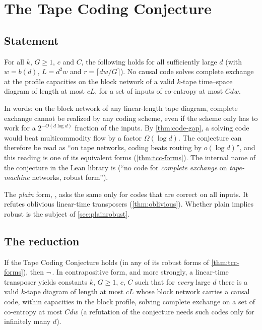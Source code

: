 \section{The Tape Coding Conjecture}\label{sec:conjecture}

\subsection{Statement}

\begin{conjecture}\label{conj:TCC}
For all $k$, $G\ge1$, $c$ and $C$, the following holds for all sufficiently large $d$ (with
$w=b(d)$, $L=d^2w$ and $r=\lceil dw/G\rceil$). No causal code solves complete exchange at the profile
capacities on the block network of a valid $k$-tape time--space diagram of length at most $cL$, for a
set of inputs of co-entropy at most $Cdw$.
\end{conjecture}

In words: on the block network of any linear-length tape diagram, complete exchange cannot be
realized by any coding scheme, even if the scheme only has to work for a $2^{-O(d\log d)}$ fraction
of the inputs. By \cref{thm:code-gap}, a solving code would beat multicommodity flow by a factor
$\Omega(\log d)$. The conjecture can therefore be read as ``on tape networks, coding beats routing by
$o(\log d)$'', and this reading is one of its equivalent forms (\cref{thm:tcc-forms}). The internal
name of the conjecture in the Lean library is  (``no code for \emph{complete
exchange} on \emph{tape-machine} networks, robust form'').

The \emph{plain} form, , asks the same only for codes that are correct on all inputs.
It refutes oblivious linear-time transposers (\cref{thm:oblivious}). Whether plain implies robust is
the subject of \cref{sec:plainrobust}.

\subsection{The reduction}

\begin{theorem}\label{thm:reduction}
If the Tape Coding Conjecture holds (in any of its robust forms of \cref{thm:tcc-forms}), then
$\neg\,$. In contrapositive form, and more strongly, a linear-time
transposer yields constants $k$, $G\ge1$, $c$, $C$ such that for \emph{every} large $d$ there is a valid
$k$-tape diagram of length at most $cL$ whose block network carries a causal code, within capacities in the
block profile, solving complete exchange on a set of co-entropy at most $Cdw$ (a refutation of the
conjecture needs such codes only for infinitely many $d$).
\end{theorem}


